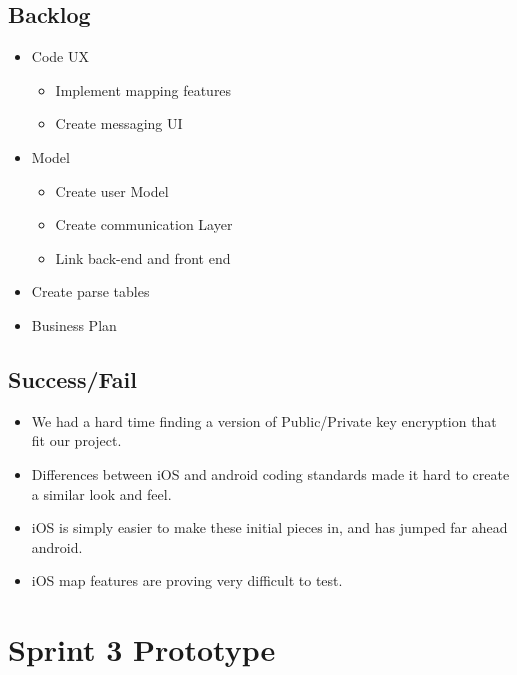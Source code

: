 \subsection{Backlog}
\begin{itemize}
	\item Code UX
	\begin{itemize}
		\item Implement mapping features
		\item Create messaging UI
	\end{itemize}
	\item Model
	\begin{itemize}
		\item Create user Model
		\item Create communication Layer
		\item Link back-end and front end
	\end{itemize}
	\item Create parse tables
	\item Business Plan
\end{itemize}
\subsection{Success/Fail}
\begin{itemize}
	\item We had a hard time finding a version of Public/Private key encryption that fit our project.
	\item Differences between iOS and android coding standards made it hard to create a similar look and feel.
	\item iOS is simply easier to make these initial pieces in, and has jumped far ahead android.
	\item iOS map features are proving very difficult to test.
\end{itemize}

\section{Sprint 3 Prototype}

